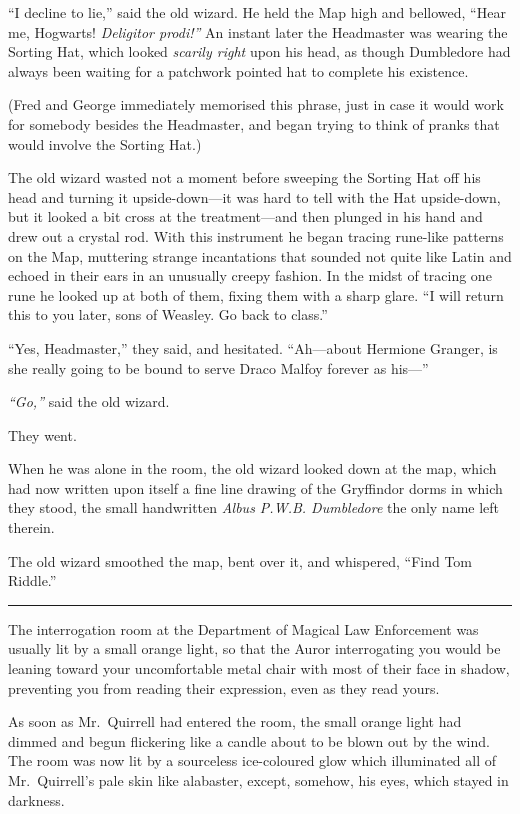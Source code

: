 ``I decline to lie,'' said the old wizard. He held the Map high and
bellowed, ``Hear me, Hogwarts! \emph{Deligitor prodi!''} An instant
later the Headmaster was wearing the Sorting Hat, which looked
\emph{scarily right} upon his head, as though Dumbledore had always been
waiting for a patchwork pointed hat to complete his existence.

(Fred and George immediately memorised this phrase, just in case it
would work for somebody besides the Headmaster, and began trying to
think of pranks that would involve the Sorting Hat.)

The old wizard wasted not a moment before sweeping the Sorting Hat off
his head and turning it upside-down---it was hard to tell with the Hat
upside-down, but it looked a bit cross at the treatment---and then
plunged in his hand and drew out a crystal rod. With this instrument he
began tracing rune-like patterns on the Map, muttering strange
incantations that sounded not quite like Latin and echoed in their ears
in an unusually creepy fashion. In the midst of tracing one rune he
looked up at both of them, fixing them with a sharp glare. ``I will
return this to you later, sons of Weasley. Go back to class.''

``Yes, Headmaster,'' they said, and hesitated. ``Ah---about Hermione
Granger, is she really going to be bound to serve Draco Malfoy forever
as his---''

\emph{``Go,''} said the old wizard.

They went.

When he was alone in the room, the old wizard looked down at the map,
which had now written upon itself a fine line drawing of the Gryffindor
dorms in which they stood, the small handwritten \emph{Albus P.W.B.
Dumbledore} the only name left therein.

The old wizard smoothed the map, bent over it, and whispered, ``Find Tom
Riddle.''

\begin{center}\rule{3in}{0.4pt}\end{center}

The interrogation room at the Department of Magical Law Enforcement was
usually lit by a small orange light, so that the Auror interrogating you
would be leaning toward your uncomfortable metal chair with most of
their face in shadow, preventing you from reading their expression, even
as they read yours.

As soon as Mr.~Quirrell had entered the room, the small orange light had
dimmed and begun flickering like a candle about to be blown out by the
wind. The room was now lit by a sourceless ice-coloured glow which
illuminated all of Mr.~Quirrell's pale skin like alabaster, except,
somehow, his eyes, which stayed in darkness.

